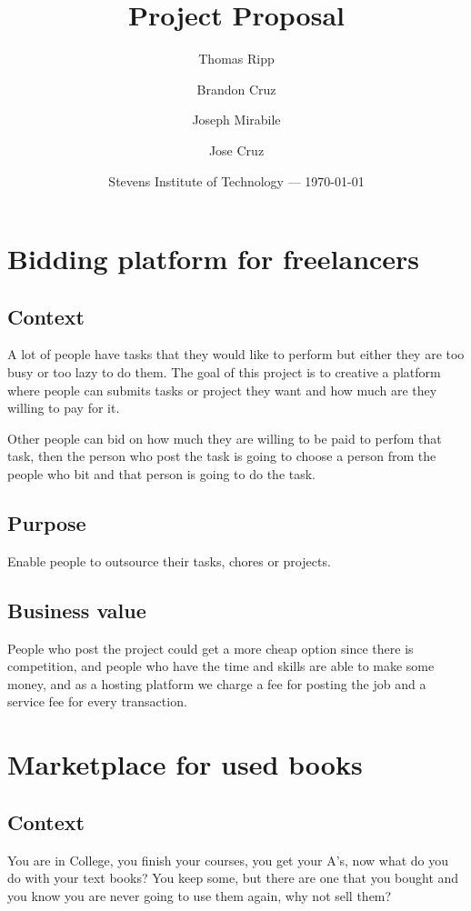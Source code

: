 \documentclass[12pt]{article}
\title{Project Proposal}
\author{
    Thomas Ripp
    \and 
    Brandon Cruz
    \and 
    Joseph Mirabile
    \and 
    Jose Cruz
}
\date{Stevens Institute of Technology --- \today}
\begin{document}
\maketitle

\tableofcontents

\pagebreak

\section{Bidding platform for freelancers}
\subsection{Context}
A lot of people have tasks that they would like to perform but either they
are too busy or too lazy to do them. The goal of this project is to creative
a platform where people can submits tasks or project they want and how much
are they willing to pay for it. 

Other people can bid on how much they are willing to be paid to perfom that
task, then the person who post the task is going to choose a person from the 
people who bit and that person is going to do the task.

\subsection{Purpose}
Enable people to outsource their tasks, chores or projects.

\subsection{Business value}
People who post the project could get a more cheap option since there is 
competition, and people who have the time and skills are able to make some 
money, and as a hosting platform we charge a fee for posting the job and a 
service fee for every transaction.

\pagebreak

\section{Marketplace for used books}
\subsection{Context}
You are in College, you finish your courses, you get your A's, now what do 
you do with your text books? You keep some, but there are one that you bought
and you know you are never going to use them again, why not sell them?
\end{document}
